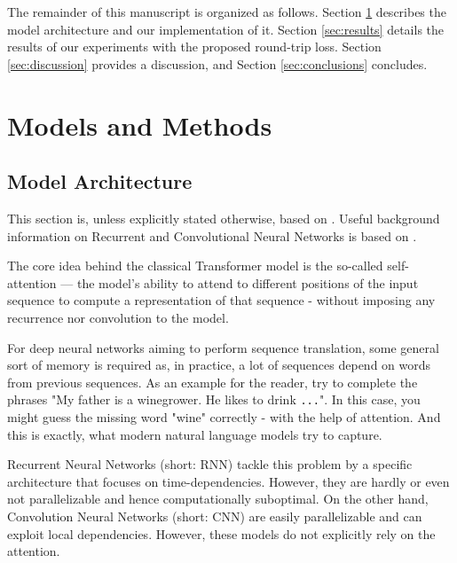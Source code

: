 \documentclass[11pt,a4paper]{article}
\begin{document}
The remainder of this manuscript is organized as follows. Section \ref{sec:models} describes the model architecture and our implementation of it. Section \ref{sec:results} details the results of our experiments with the proposed round-trip loss. Section \ref{sec:discussion} provides a discussion, and Section \ref{sec:conclusions} concludes.

\section{Models and Methods}\label{sec:models}
\subsection{Model Architecture}

This section is, unless explicitly stated otherwise, based on \cite{transformer}. Useful background information on Recurrent and Convolutional Neural Networks is based on \cite{Goodfellow-et-al-2016}.

The core idea behind the classical Transformer model is the so-called self-attention — the model's ability to attend to different positions of the input sequence to compute a representation of that sequence - without imposing any recurrence nor convolution to the model.

For deep neural networks aiming to perform sequence translation, some general sort of memory is required as, in practice, a lot of sequences depend on words from previous sequences. As an example for the reader, try to complete the phrases "My father is a winegrower. He likes to drink {\tt ...}". In this case, you might guess the missing word "wine" correctly - with the help of attention. And this is exactly, what modern natural language models try to capture.

Recurrent Neural Networks (short: RNN) tackle this problem by a specific architecture that focuses on time-dependencies. However, they are hardly or even not parallelizable and hence computationally suboptimal.
On the other hand, Convolution Neural Networks (short: CNN) are easily parallelizable and can exploit local dependencies. However, these models do not explicitly rely on the attention.
\end{document}
